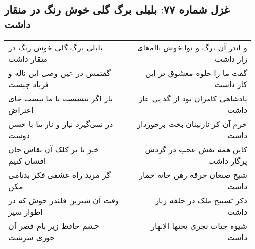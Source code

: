\begin{center}
\section*{غزل شماره ۷۷: بلبلی برگ گلی خوش رنگ در منقار داشت}
\label{sec:sh077}
\begin{longtable}{l p{0.5cm} r}
بلبلی برگ گلی خوش رنگ در منقار داشت
&&
و اندر آن برگ و نوا خوش ناله‌های زار داشت
\\
گفتمش در عین وصل این ناله و فریاد چیست
&&
گفت ما را جلوه معشوق در این کار داشت
\\
یار اگر ننشست با ما نیست جای اعتراض
&&
پادشاهی کامران بود از گدایی عار داشت
\\
در نمی‌گیرد نیاز و ناز ما با حسن دوست
&&
خرم آن کز نازنینان بخت برخوردار داشت
\\
خیز تا بر کلک آن نقاش جان افشان کنیم
&&
کاین همه نقش عجب در گردش پرگار داشت
\\
گر مرید راه عشقی فکر بدنامی مکن
&&
شیخ صنعان خرقه رهن خانه خمار داشت
\\
وقت آن شیرین قلندر خوش که در اطوار سیر
&&
ذکر تسبیح ملک در حلقه زنار داشت
\\
چشم حافظ زیر بام قصر آن حوری سرشت
&&
شیوه جنات تجری تحتها الانهار داشت
\\
\end{longtable}
\end{center}
